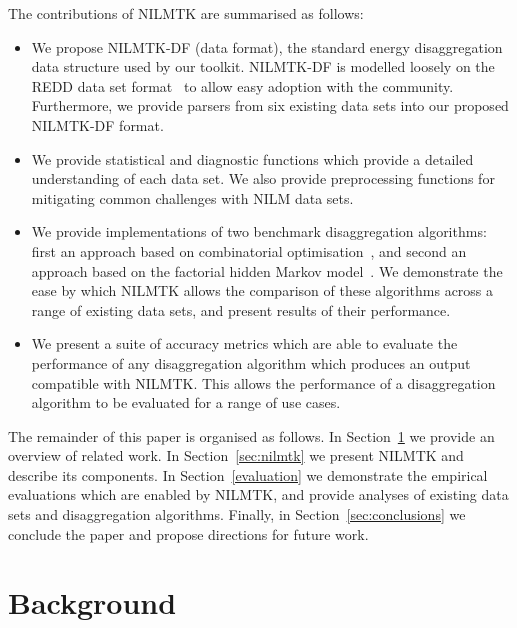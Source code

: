 \documentclass{sig-alternate}
\newcommand{\bluecolor}[1]{\textcolor{blue}{#1}}
\newcommand{\secref}[1]{Section~\ref{#1}}
\begin{document}
The contributions of NILMTK are summarised as follows:
\begin{itemize}
\item We propose NILMTK-DF (data format), the standard energy disaggregation data structure used by our toolkit.  NILMTK-DF is modelled loosely on the REDD data set format~\cite{redd} to allow easy adoption with the community. Furthermore, we provide parsers from six existing data sets into our proposed NILMTK-DF format. 
\item We provide statistical and diagnostic functions which provide a detailed understanding of each data set.  We also provide preprocessing functions for mitigating common challenges with NILM data sets.
\item We provide implementations of two benchmark disaggregation algorithms: first an approach based on combinatorial optimisation~\cite{hart_1992}, and second an approach based on the factorial hidden Markov model~\cite{redd,kim_2011}. We demonstrate the ease by which NILMTK allows the comparison of these algorithms across a range of existing data sets, and present results of their performance.
\item We present a suite of accuracy metrics which are able to evaluate the performance of any disaggregation algorithm which produces an output compatible with NILMTK. This allows the performance of a disaggregation algorithm to be evaluated for a range of use cases.
\end{itemize}

The remainder of this paper is organised as follows. In \secref{sec:related} we provide an overview of related work. In \secref{sec:nilmtk} we present NILMTK and describe its components. In \secref{evaluation} we demonstrate the empirical evaluations which are enabled by NILMTK, and provide analyses of existing data sets and disaggregation algorithms. Finally, in \secref{sec:conclusions} we conclude the paper and propose directions for future work.

\section{Background}
\label{sec:related}
\end{document}
